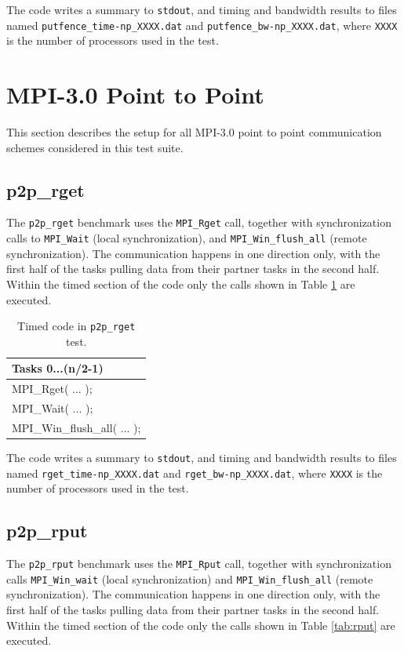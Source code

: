 \documentclass[10pt,a4paper]{report}
\begin{document}
The code writes a summary to \verb+stdout+, and timing and bandwidth results to files named \verb+putfence_time-np_XXXX.dat+ and \verb+putfence_bw-np_XXXX.dat+, where \verb+XXXX+ is the number of processors used in the test.

\FloatBarrier
\section{MPI-3.0 Point to Point}
This section describes the setup for all MPI-3.0 point to point communication schemes considered in this test suite.

\subsection{p2p\_rget}
The \verb+p2p_rget+ benchmark uses the \verb+MPI_Rget+ call, together with synchronization calls to \verb+MPI_Wait+ (local synchronization), and \verb+MPI_Win_flush_all+ (remote synchronization). The communication happens in one direction only, with the first half of the tasks pulling data from their partner tasks in the second half. Within the timed section of the code only the calls shown in Table \ref{tab:rget} are executed.

\begin{table}[ht]
\centering
\caption{Timed code in \texttt{p2p\_rget} test.}
\label{tab:rget}
\begin{tabular}{|l|}
\hline
\bf{Tasks 0...(n/2-1)}	   \\\hline
MPI\_Rget( ... );           \\
MPI\_Wait( ... );           \\
MPI\_Win\_flush\_all( ... );\\\hline
\end{tabular}
\end{table}

The code writes a summary to \verb+stdout+, and timing and bandwidth results to files named \verb+rget_time-np_XXXX.dat+ and \verb+rget_bw-np_XXXX.dat+, where \verb+XXXX+ is the number of processors used in the test.

\FloatBarrier
\subsection{p2p\_rput}
The \verb+p2p_rput+ benchmark uses the \verb+MPI_Rput+ call, together with synchronization calls \verb+MPI_Win_wait+ (local synchronization) and \verb+MPI_Win_flush_all+ (remote synchronization). The communication happens in one direction only, with the first half of the tasks pulling data from their partner tasks in the second half. Within the timed section of the code only the calls shown in Table \ref{tab:rput} are executed.
\end{document}

